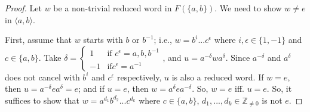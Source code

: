 \documentclass{amsart}
\theoremstyle{definition}
\newcommand{\Z}{\mathbb Z}
\begin{document}
\begin{proof}
	Let $w$ be a non-trivial reduced word in $F(\{a,b\})$. We need to show $w\not=e$ in $\langle a,b\rangle$.

First, assume that $w$ starts with $b$ or $b^{-1}$; i.e., $w=b^i...c^{\epsilon}$ where $i,\epsilon\in\{1,-1\}$ and $c\in\{a,b\}$. Take $\delta=\begin{cases}
	1&\text{if }c^\epsilon=a,b,b^{-1}\\
	-1&\text{if} c^\epsilon=a^{-1}
\end{cases}$, and $u=a^{-\delta}wa^\delta$. Since $a^{-\delta}$ and $a^{\delta}$ does not cancel with $b^i$ and $c^\epsilon$ respectively, $u$ is also a reduced word. If $w=e$, then $u=a^{-\delta}ea^\delta=e$; and if $u=e$, then $w=a^\delta ea^{-\delta}$. So, $w=e$ iff. $u=e$. So, it suffices to show that $w=a^{d_1}b^{d_2}...c^{d_k}$ where $c\in\{a,b\}$, $d_1,...,d_k\in\Z_{\not=0}$ is not $e$.


\end{proof}
\end{document}
